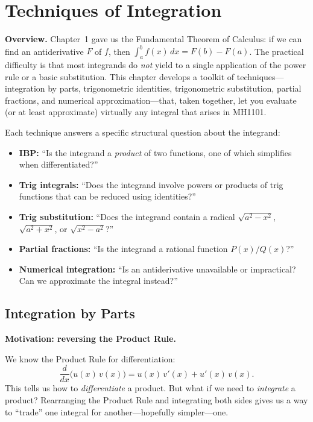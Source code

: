 
\section{Techniques of Integration}

\textbf{Overview.}
Chapter~1 gave us the Fundamental Theorem of Calculus: if we can find an antiderivative $F$ of $f$, then $\int_a^b f(x)\,dx=F(b)-F(a)$.
The practical difficulty is that most integrands do \emph{not} yield to a single application of the power rule or a basic substitution.
This chapter develops a toolkit of techniques---integration by parts, trigonometric identities, trigonometric substitution, partial fractions, and numerical approximation---that, taken together, let you evaluate (or at least approximate) virtually any integral that arises in MH1101.

Each technique answers a specific structural question about the integrand:

\begin{itemize}[leftmargin=*]
\item \textbf{IBP:} ``Is the integrand a \emph{product} of two functions, one of which simplifies when differentiated?''
\item \textbf{Trig integrals:} ``Does the integrand involve powers or products of trig functions that can be reduced using identities?''
\item \textbf{Trig substitution:} ``Does the integrand contain a radical $\sqrt{a^2-x^2}$, $\sqrt{a^2+x^2}$, or $\sqrt{x^2-a^2}$?''
\item \textbf{Partial fractions:} ``Is the integrand a rational function $P(x)/Q(x)$?''
\item \textbf{Numerical integration:} ``Is an antiderivative unavailable or impractical? Can we approximate the integral instead?''
\end{itemize}

\subsection{Integration by Parts}

\textbf{Motivation: reversing the Product Rule.}

We know the Product Rule for differentiation:
\[
\frac{d}{dx}\bigl(u(x)\,v(x)\bigr)=u(x)\,v'(x)+u'(x)\,v(x).
\]
This tells us how to \emph{differentiate} a product. But what if we need to \emph{integrate} a product? Rearranging the Product Rule and integrating both sides gives us a way to ``trade'' one integral for another---hopefully simpler---one.


